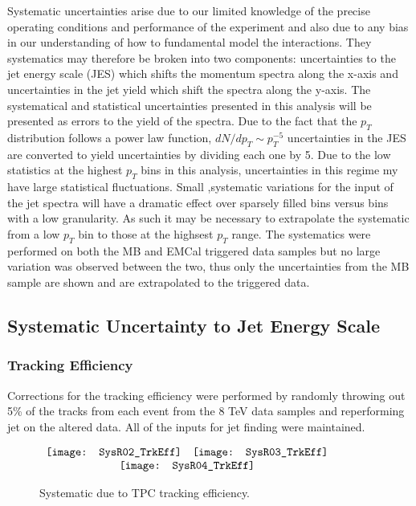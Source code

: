 Systematic uncertainties arise due to our limited knowledge of the precise operating conditions and performance of the experiment and also due to any bias in our understanding of how to fundamental model the interactions.  They systematics may therefore be broken into two components: uncertainties to the jet energy scale (JES) which shifts the momentum spectra along the x-axis and uncertainties in the jet yield which shift the spectra along the y-axis.  The systematical and statistical uncertainties presented in this analysis will be presented as errors to the yield of the spectra.  Due to the fact that the $p_{T}$ distribution follows a power law function, $dN/dp_{T} \sim p_{T}^{-5}$ uncertainties in the JES are converted to yield uncertainties by dividing each one by 5.
Due to the low statistics at the highest $p_{T}$ bins in this analysis, uncertainties in this regime my have large statistical fluctuations.  Small ,systematic variations for the input of the jet spectra will have a dramatic effect over sparsely filled bins versus bins with a low granularity.  As such it may be necessary to extrapolate the systematic from a low $p_{T}$ bin to those at the highsest $p_{T}$ range.  The systematics were performed on both the MB and EMCal triggered data samples but no large variation was observed between the two, thus only the uncertainties from the MB sample are shown and are extrapolated to the triggered data.


\subsection{Systematic Uncertainty to Jet Energy Scale}

\subsubsection{Tracking Efficiency}
Corrections for the tracking efficiency were performed by randomly throwing out 5\% of the tracks from each event from the 8 TeV data samples and reperforming jet on the altered data.  All of the inputs for jet finding were maintained.


\begin{figure*}[t!]
$\begin{array}{rl}
    \texttt{[image: SysR02\_TrkEff]} &
    \texttt{[image: SysR03\_TrkEff]}\\
    \multicolumn{2}{c}{\texttt{[image: SysR04\_TrkEff]}}
\end{array}$
\caption[Systematic due to TPC tracking efficiency.]{\label{fig:trkeff}Systematic due to TPC tracking efficiency.}
\end{figure*}

